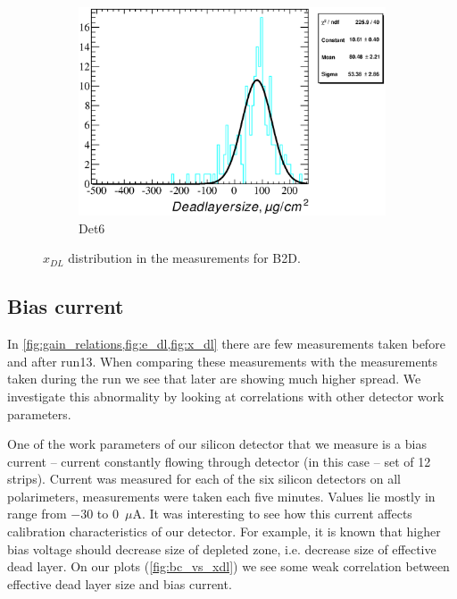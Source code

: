 \documentclass[a4paper,12pt]{article}
\begin{document}
\begin{figure}
\begin{subfigure}[b]{0.325\textwidth}
\includegraphics[width=\textwidth]{gfx/run13_alpha_study/B2D/c_hDeadLayerSize_by_run_distribution6_B2D.eps}
\caption{Det6}
\end{subfigure}
\caption{$x_{DL}$ distribution in the measurements for B2D.}
\end{figure}

\subsection{Bias current}


In \cref{fig:gain_relations,fig:e_dl,fig:x_dl} there are few measurements taken
before and after run13. When comparing these measurements with the measurements
taken during the run we see that later are showing much higher spread.  We
investigate this abnormality by looking at correlations with other
detector work parameters.

One of the work parameters of our silicon detector that we measure is a bias
current -- current constantly flowing through detector (in this case -- set of
12 strips). Current was measured for each of the six silicon detectors on all
polarimeters, measurements were taken each five minutes. Values lie mostly in
range from $-30$ to $0$~$\mu\text{A}$. It was interesting to see how this current
affects calibration characteristics of our detector. For example, it is known
that higher bias voltage should decrease size of depleted zone, i.e. decrease
size of effective dead layer. On our plots (\cref{fig:bc_vs_xdl}) we see some weak
correlation between effective dead layer size and bias current.
\end{document}
